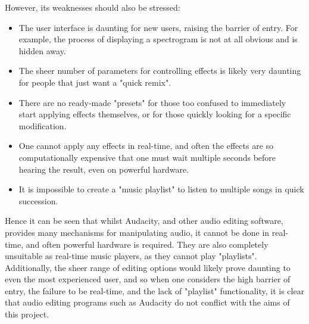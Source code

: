 However, its weaknesses should also be stressed:
\begin{itemize}
	\item The user interface is daunting for new users, raising the barrier of entry. For example, the process of displaying a spectrogram is not at all obvious and is hidden away.
	\item The sheer number of parameters for controlling effects is likely very daunting for people that just want a "quick remix".
	\item There are no ready-made "presets" for those too confused to immediately start applying effects themselves, or for those quickly looking for a specific modification.
	\item One cannot apply any effects in real-time, and often the effects are so computationally expensive that one must wait multiple seconds before hearing the result, even on powerful hardware.
	\item It is impossible to create a "music playlist" to listen to multiple songs in quick succession.
\end{itemize}

Hence it can be seen that whilst Audacity, and other audio editing software, provides many mechanisms for manipulating audio, it cannot be done in real-time, and often powerful hardware is required. They are also completely unsuitable as real-time music players, as they cannot play "playlists". Additionally, the sheer range of editing options would likely prove daunting to even the most experienced user, and so when one considers the high barrier of entry, the failure to be real-time, and the lack of "playlist" functionality, it is clear that audio editing programs such as Audacity do not conflict with the aims of this project.

